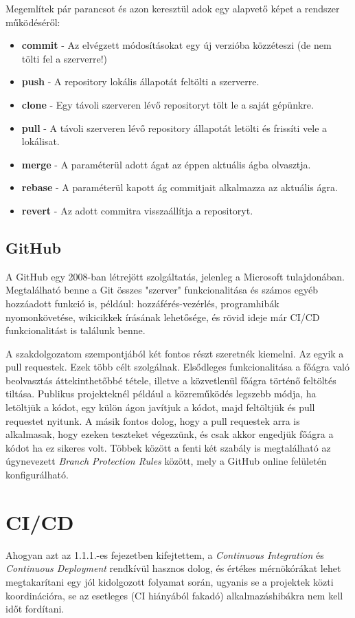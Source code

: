 Megemlítek pár parancsot és azon keresztül adok egy alapvető képet a rendszer működéséről:
\begin{itemize}
    \item \textbf{commit} - Az elvégzett módosításokat egy új verzióba közzéteszi (de nem tölti fel a szerverre!)
    \item \textbf{push} - A repository lokális állapotát feltölti a szerverre.
    \item \textbf{clone} - Egy távoli szerveren lévő repositoryt tölt le a saját gépünkre.
    \item \textbf{pull} - A távoli szerveren lévő repository állapotát letölti és frissíti vele a lokálisat.
    \item \textbf{merge} - A paraméterül adott ágat az éppen aktuális ágba olvasztja.
    \item \textbf{rebase} - A paraméterül kapott ág commitjait alkalmazza az aktuális ágra.
    \item \textbf{revert} - Az adott commitra visszaállítja a repositoryt.
\end{itemize}
\subsection{GitHub}
A GitHub egy 2008-ban létrejött szolgáltatás, jelenleg a Microsoft tulajdonában. Megtalálható benne a Git összes "szerver" funkcionalitása és számos egyéb hozzáadott funkció is, például: hozzáférés-vezérlés, programhibák nyomonkövetése, wikicikkek írásának lehetősége, és rövid ideje már CI/CD funkcionalitást is találunk benne.

A szakdolgozatom szempontjából két fontos részt szeretnék kiemelni. Az egyik a pull requestek. Ezek több célt szolgálnak. Elsődleges funkcionalitása a főágra való beolvasztás áttekinthetőbbé tétele, illetve a közvetlenül főágra történő feltöltés tiltása. Publikus projekteknél például a közreműködés legszebb módja, ha letöltjük a kódot, egy külön ágon javítjuk a kódot, majd feltöltjük és pull requestet nyitunk. A másik fontos dolog, hogy a pull requestek arra is alkalmasak, hogy ezeken teszteket végezzünk, és csak akkor engedjük főágra a kódot ha ez sikeres volt. Többek között a fenti két szabály is megtalálható az úgynevezett \textit{Branch Protection Rules} között, mely a GitHub online felületén konfigurálható.
\section{CI/CD}
Ahogyan azt az 1.1.1.-es fejezetben kifejtettem, a \textit{Continuous Integration} és \textit{Continuous Deployment} rendkívül hasznos dolog, és értékes mérnökórákat lehet megtakarítani egy jól kidolgozott folyamat során, ugyanis se a projektek közti koordinációra, se az esetleges (CI hiányából fakadó) alkalmazáshibákra nem kell időt fordítani.

